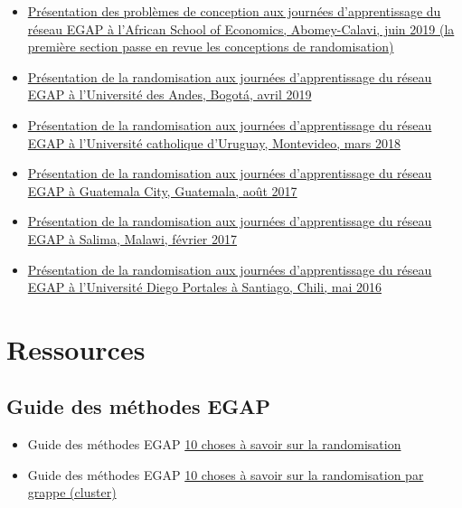 \documentclass[12pt,]{book}
\begin{document}
\begin{itemize}
\item
  \href{https://egap.github.io/learningdays-resources/Slides/Examples/threats-benin.pdf}{Présentation des problèmes de conception aux journées d'apprentissage du réseau EGAP à l'African School of Economics, Abomey-Calavi, juin 2019 (la première section passe en revue les conceptions de randomisation)}
\item
  \href{https://egap.github.io/learningdays-resources/Slides/Examples/randomization-bogota.pdf}{Présentation de la randomisation aux journées d'apprentissage du réseau EGAP à l'Université des Andes, Bogotá, avril 2019}
\item
  \href{https://egap.github.io/learningdays-resources/Slides/Examples/randomization-montevideo.pdf}{Présentation de la randomisation aux journées d'apprentissage du réseau EGAP à l'Université catholique d'Uruguay, Montevideo, mars 2018}
\item
  \href{https://egap.github.io/learningdays-resources/Slides/Examples/randomization-guatemala.pdf}{Présentation de la randomisation aux journées d'apprentissage du réseau EGAP à Guatemala City, Guatemala, août 2017}
\item
  \href{https://egap.github.io/learningdays-resources/Slides/Examples/randomization-malawi.pdf}{Présentation de la randomisation aux journées d'apprentissage du réseau EGAP à Salima, Malawi, février 2017}
\item
  \href{https://egap.github.io/learningdays-resources/Slides/Examples/randomization-santiago.pdf}{Présentation de la randomisation aux journées d'apprentissage du réseau EGAP à l'Université Diego Portales à Santiago, Chili, mai 2016}
\end{itemize}

\hypertarget{ressources-2}{%
\section{Ressources}\label{ressources-2}}

\hypertarget{guide-des-muxe9thodes-egap-2}{%
\subsection{Guide des méthodes EGAP}\label{guide-des-muxe9thodes-egap-2}}

\begin{itemize}
\item
  Guide des méthodes EGAP \href{https://egap.org/resource/10-things-to-know-about-randomization/}{10 choses à savoir sur la randomisation}
\item
  Guide des méthodes EGAP \href{https://egap.org/resource/10-things-to-know-about-cluster-randomization/}{10 choses à savoir sur la randomisation par grappe (cluster)}
\end{itemize}
\end{document}
